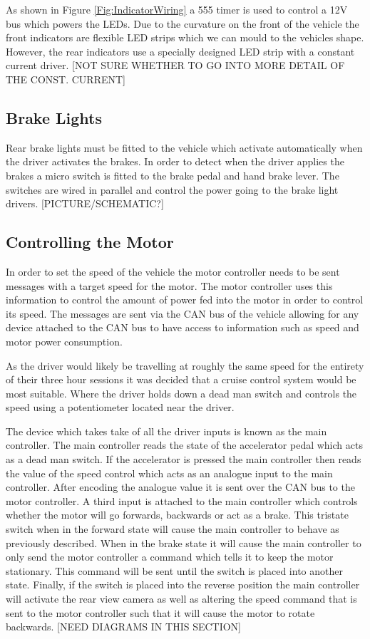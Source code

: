 \documentclass[10pt,a4paper]{article}
\begin{document}
As shown in Figure \ref{Fig:IndicatorWiring} a 555 timer is used to control a 12V bus which powers the LEDs. Due to the curvature on the front of the vehicle the front indicators are flexible LED strips which we can mould to the vehicles shape. However, the rear indicators use a specially designed LED strip with a constant current driver. [NOT SURE WHETHER TO GO INTO MORE DETAIL OF THE CONST. CURRENT]

\subsection{Brake Lights}

Rear brake lights must be fitted to the vehicle which activate automatically when the driver activates the brakes. In order to detect when the driver applies the brakes a micro switch is fitted to the brake pedal and hand brake lever. The switches are wired in parallel and control the power going to the brake light drivers. [PICTURE/SCHEMATIC?]

\subsection{Controlling the Motor}
In order to set the speed of the vehicle the motor controller needs to be sent messages with a target speed for the motor. The motor controller uses this information to control the amount of power fed into the motor in order to control its speed. The messages are sent via the CAN bus of the vehicle allowing for any device attached to the CAN bus to have access to information such as speed and motor power consumption. 

As the driver would likely be travelling at roughly the same speed for the entirety of their three hour sessions it was decided that a cruise control system would be most suitable. Where the driver holds down a dead man switch and controls the speed using a potentiometer located near the driver.

The device which takes take of all the driver inputs is known as the main controller. The main controller reads the state of the accelerator pedal which acts as a dead man switch. If the accelerator is pressed the main controller then reads the value of the speed control which acts as an analogue input to the main controller. After encoding the analogue value it is sent over the CAN bus to the motor controller. A third input is attached to the main controller which controls whether the motor will go forwards, backwards or act as a brake. This tristate switch when in the forward state will cause the main controller to behave as previously described. When in the brake state it will cause the main controller to only send the motor controller a command which tells it to keep the motor stationary. This command will be sent until the switch is placed into another state. Finally, if the switch is placed into the reverse position the main controller will activate the rear view camera as well as altering the speed command that is sent to the motor controller such that it will cause the motor to rotate backwards.
[NEED DIAGRAMS IN THIS SECTION]
\end{document}
